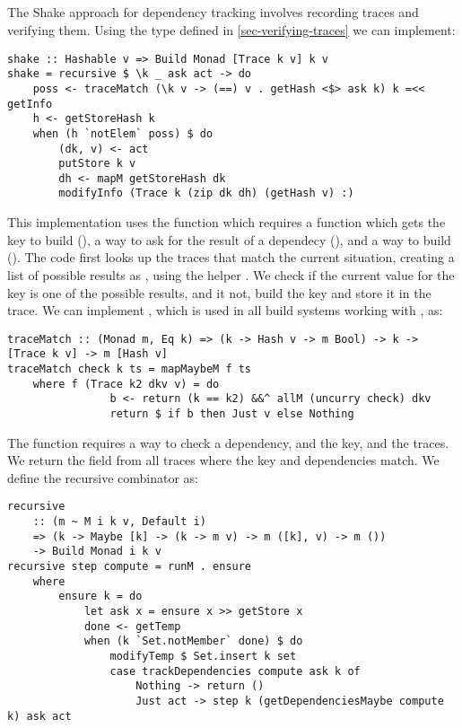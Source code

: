 \subsection{\Shake}\label{sec-implementation-shake}

The Shake approach for dependency tracking involves recording traces and verifying them. Using the  type defined in \ref{sec-verifying-traces} we can implement:

\begin{verbatim}
shake :: Hashable v => Build Monad [Trace k v] k v
shake = recursive $ \k _ ask act -> do
    poss <- traceMatch (\k v -> (==) v . getHash <$> ask k) k =<< getInfo
    h <- getStoreHash k
    when (h `notElem` poss) $ do
        (dk, v) <- act
        putStore k v
        dh <- mapM getStoreHash dk
        modifyInfo (Trace k (zip dk dh) (getHash v) :)
\end{verbatim}

This implementation uses the  function which requires a function which gets the key to build (), a way to ask for the result of a dependecy (), and a way to build  (). The code first looks up the traces that match the current situation, creating a list of possible results as , using the helper . We check if the current value for the key is one of the possible results, and it not, build the key and store it in the trace. We can implement , which is used in all build systems working with , as:

\begin{verbatim}
traceMatch :: (Monad m, Eq k) => (k -> Hash v -> m Bool) -> k -> [Trace k v] -> m [Hash v]
traceMatch check k ts = mapMaybeM f ts
    where f (Trace k2 dkv v) = do
                b <- return (k == k2) &&^ allM (uncurry check) dkv
                return $ if b then Just v else Nothing
\end{verbatim}

The function  requires a way to check a dependency, and the key, and the traces. We return the  field from all traces where the key and dependencies match. We define the recursive combinator as:

\begin{verbatim}
recursive
    :: (m ~ M i k v, Default i)
    => (k -> Maybe [k] -> (k -> m v) -> m ([k], v) -> m ())
    -> Build Monad i k v
recursive step compute = runM . ensure
    where
        ensure k = do
            let ask x = ensure x >> getStore x
            done <- getTemp
            when (k `Set.notMember` done) $ do
                modifyTemp $ Set.insert k set
                case trackDependencies compute ask k of
                    Nothing -> return ()
                    Just act -> step k (getDependenciesMaybe compute k) ask act
\end{verbatim}

